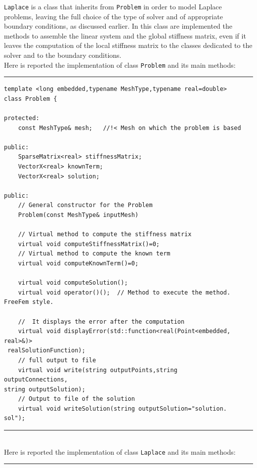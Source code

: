 \verb|Laplace| is a class that inherits from \verb|Problem| in order to model Laplace problems, leaving the full choice of the type of solver and of appropriate boundary conditions, as discussed earlier. In this class are implemented the methods to assemble the linear system and the global stiffness matrix, even if it leaves the computation of the local stiffness matrix to the classes dedicated to the solver and to the boundary conditions. \\

Here is reported the implementation of class \verb|Problem| and its main methods:

\noindent\rule{16cm}{1pt}
\begin{lstlisting}[caption=File \texttt{Problem.h}]
template <long embedded,typename MeshType,typename real=double>
class Problem {
	
protected:
    const MeshType& mesh;	//!< Mesh on which the problem is based

public:
    SparseMatrix<real> stiffnessMatrix;
    VectorX<real> knownTerm;
    VectorX<real> solution;
	
public:
    // General constructor for the Problem
    Problem(const MeshType& inputMesh)

    // Virtual method to compute the stiffness matrix
    virtual void computeStiffnessMatrix()=0;
    // Virtual method to compute the known term
    virtual void computeKnownTerm()=0;	

    virtual void computeSolution();
    virtual void operator()();  // Method to execute the method.
FreeFem style.

    //  It displays the error after the computation
    virtual void displayError(std::function<real(Point<embedded,
real>&)>
 realSolutionFunction);
    // full output to file 
    virtual void write(string outputPoints,string 
outputConnections,
string outputSolution);	
    // Output to file of the solution
    virtual void writeSolution(string outputSolution="solution.
sol");
\end{lstlisting}
\noindent\rule{16cm}{1pt}\\

Here is reported the implementation of class \verb|Laplace| and its main methods:

\noindent\rule{16cm}{1pt}

